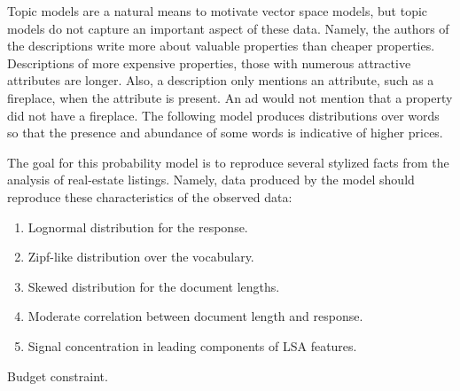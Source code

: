 \documentclass[10pt]{article}
\begin{document}
Topic models are a natural means to motivate vector space models, but topic models do not capture an important aspect of these data.  Namely, the authors of the descriptions write more about valuable properties than cheaper properties.  Descriptions of more expensive properties, those with numerous attractive attributes are longer.  Also, a description only mentions an attribute, such as a fireplace, when the attribute is present.  An ad would not mention that a property did not have a fireplace.  The following model produces distributions over words so that the presence and abundance of some words is indicative of higher prices.

The goal for this probability model is to reproduce several stylized facts from the analysis of real-estate listings.  Namely, data produced by the model should reproduce these characteristics of the observed data:
\begin{enumerate}
  \item Lognormal distribution for the response.
  \item Zipf-like distribution over the vocabulary.
  \item Skewed distribution for the document lengths.
  \item Moderate correlation between document length and response.
  \item Signal concentration in leading components of LSA features.
\end{enumerate}


\clearpage

Budget constraint.
\end{document}
